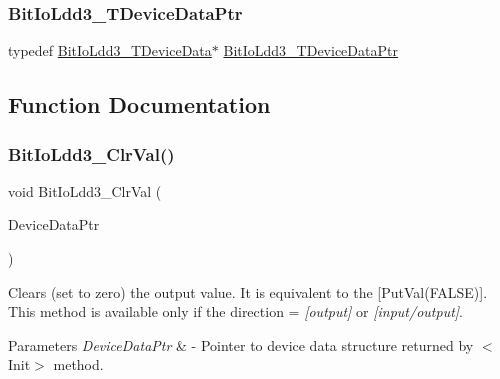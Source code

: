 \subsubsection{\texorpdfstring{Bit\+Io\+Ldd3\+\_\+\+T\+Device\+Data\+Ptr}{BitIoLdd3\_TDeviceDataPtr}}
{\footnotesize\ttfamily typedef \hyperlink{struct_bit_io_ldd3___t_device_data}{Bit\+Io\+Ldd3\+\_\+\+T\+Device\+Data}$\ast$ \hyperlink{group___bit_io_ldd3__module_gaa162b471b4dc4d029c586b9fd25eb188}{Bit\+Io\+Ldd3\+\_\+\+T\+Device\+Data\+Ptr}}



\subsection{Function Documentation}
\mbox{\label{group___bit_io_ldd3__module_gad1e5677bb374a68ea95ddac2e5b08503}} 
\subsubsection{\texorpdfstring{Bit\+Io\+Ldd3\+\_\+\+Clr\+Val()}{BitIoLdd3\_ClrVal()}}
{\footnotesize\ttfamily void Bit\+Io\+Ldd3\+\_\+\+Clr\+Val (\begin{DoxyParamCaption}\item[{\hyperlink{group___p_e___types__module_gac5cf1362f1f0e3a2ce71b1bf2276d091}{L\+D\+D\+\_\+\+T\+Device\+Data} $\ast$}]{Device\+Data\+Ptr }\end{DoxyParamCaption})}



Clears (set to zero) the output value. It is equivalent to the \mbox{[}Put\+Val(\+F\+A\+L\+S\+E)\mbox{]}. This method is available only if the direction = {\itshape \mbox{[}output\mbox{]}} or {\itshape \mbox{[}input/output\mbox{]}}. 


\begin{DoxyParams}{Parameters}
{\em Device\+Data\+Ptr} & -\/ Pointer to device data structure returned by $<$\+Init$>$ method. \\
\hline
\end{DoxyParams}
\mbox{\label{group___bit_io_ldd3__module_gaf69704b3907d4685c381341b67daf0f2}} 

